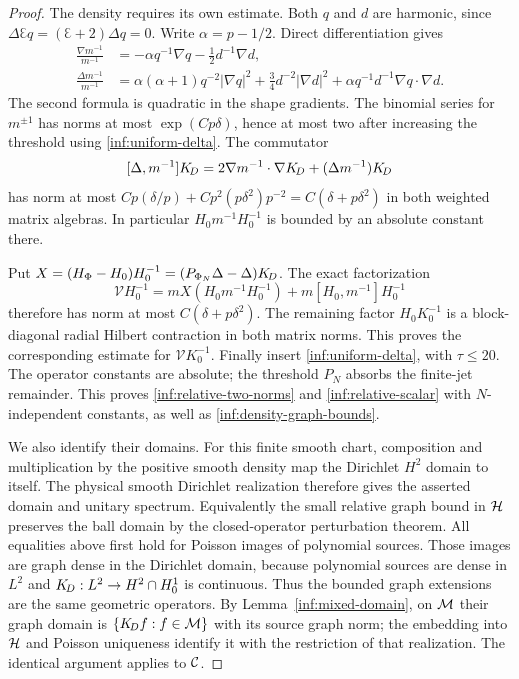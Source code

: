 \begin{proof}
The density requires its own estimate. Both $q$ and $d$ are
harmonic, since $\Delta\Euler q=(\Euler+2)\Delta q=0$.
Write $\alpha=p-1/2$. Direct differentiation gives
\begin{align}
 \frac{\nabla m^{-1}}{m^{-1}}
 &=-\alpha q^{-1}\nabla q-\tfrac12d^{-1}\nabla d,
 \label{inf:density-gradient}\\
 \frac{\Delta m^{-1}}{m^{-1}}
 &=\alpha(\alpha+1)q^{-2}|\nabla q|^2
       +\tfrac34d^{-2}|\nabla d|^2
       +\alpha q^{-1}d^{-1}\nabla q\cdot\nabla d.
 \label{inf:density-Laplacian}
\end{align}
The second formula is quadratic in the shape gradients.
The binomial series for $m^{\pm1}$ has norms at most
$\exp(Cp\delta)$, hence at most two after increasing the
threshold using \eqref{inf:uniform-delta}.
The commutator
\[
 [\Delta,m^{-1}]K_{\!D}
 =2\nabla m^{-1}\cdot\nabla K_{\!D}+(\Delta m^{-1})K_{\!D}
\]
has norm at most
$Cp(\delta/p)+Cp^2(p\delta^2)p^{-2}
=C(\delta+p\delta^2)$ in both weighted matrix algebras.
In particular $H_0m^{-1}H_0^{-1}$ is bounded by an absolute
constant there.

Put $X=(H_\Phi-H_0)H_0^{-1}
=(P_{\Phi_N}\Delta-\Delta)K_{\!D}$.
The exact factorization
\[
 \mathcal VH_0^{-1}
 =mX(H_0m^{-1}H_0^{-1})+m[H_0,m^{-1}]H_0^{-1}
\]
therefore has norm at most $C(\delta+p\delta^2)$.
The remaining factor $H_0K_0^{-1}$ is a block-diagonal radial
Hilbert contraction in both matrix norms. This proves the
corresponding estimate for $\mathcal VK_0^{-1}$.
Finally insert \eqref{inf:uniform-delta}, with $\tau\le20$.
The operator constants are absolute; the threshold $P_N$ absorbs
the finite-jet remainder. This proves
\eqref{inf:relative-two-norms} and \eqref{inf:relative-scalar}
with $N$-independent constants, as well as
\eqref{inf:density-graph-bounds}.

We also identify their domains. For this finite smooth chart,
composition and multiplication by the positive smooth density
map the Dirichlet $H^2$ domain to itself. The physical smooth
Dirichlet realization therefore gives the asserted domain and
unitary spectrum. Equivalently the small relative graph bound
in $\mathcal{H}$ preserves the ball domain by the closed-operator
perturbation theorem. All equalities above first hold for Poisson
images of polynomial sources. Those images are graph dense in
the Dirichlet domain, because polynomial sources are dense in
$L^2$ and $K_{\!D}:L^2\to H^2\cap H^1_0$ is continuous.
Thus the bounded graph extensions are the same geometric
operators. By Lemma~\ref{inf:mixed-domain}, on $\mathcal M$ their graph domain is
$\{K_{\!D} f:f\in\mathcal M\}$ with its source graph norm; the embedding
into $\mathcal{H}$ and Poisson uniqueness identify it with the restriction
of that realization. The identical argument applies to $\mathcal C$.
\end{proof}
